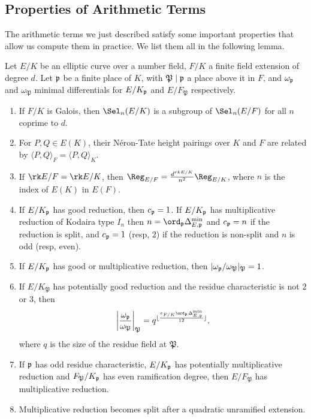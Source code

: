 \subsection{Properties of Arithmetic Terms}

The arithmetic terms we just described satisfy some important properties that allow us compute them in practice. We list them all in the following lemma.

\begin{lemma}
    Let $E/K$ be an elliptic curve over a number field, $F/K$ a finite field extension of degree $d$. Let $\mathfrak{p}$ be a finite place of $K$, with $\mathfrak{P}\mid\mathfrak{p}$ a place above it in $F$, and $\omega_{\mathfrak{p}}$ and $\omega_\mathfrak{P}$ minimal differentials for $E/K_{\mathfrak{p}}$ and $E/F_\mathfrak{P}$ respectively.
    \begin{enumerate}
        \item If $F/K$ is Galois, then $\Sel_n(E/K)$ is a subgroup of $\Sel_n(E/F)$ for all $n$ coprime to $d$.
        \item For $P,Q\in E(K)$, their Néron-Tate height pairings over $K$ and $F$ are related by $\langle P,Q\rangle_F=\langle P,Q\rangle_K$.
        \item If $\rk E/F=\rk E/K$, then $\Reg_{E/F}=\frac{d^{rk E/K}}{n^2}\Reg_{E/K}$, where $n$ is the index of $E(K)$ in $E(F)$.
        \item If $E/K_{\mathfrak{p}}$ has good reduction, then $c_{\mathfrak{p}}=1$. If $E/K_{\mathfrak{p}}$ has multiplicative reduction of Kodaira type $I_n$ then $n=\ord_\pp\Delta_{E,\pp}^{\min}$ and $c_{\mathfrak{p}}=n$ if the reduction is split, and $c_{\mathfrak{p}}=1$ (resp, $2$) if the reduction is non-split and $n$ is odd (resp, even).
        \item If $E/K_{\mathfrak{p}}$ has good or multiplicative reduction, then $|\omega_{\mathfrak{p}}/\omega_\mathfrak{P}|_\mathfrak{P}=1$.
        \item If $E/K_\mathfrak{P}$ has potentially good reduction and the residue characteristic is not $2$ or $3$, then 
        $$\left|\frac{\omega_\pp}{\omega_\mathfrak{P}}\right|_\mathfrak{P}=q^{\floor{\frac{e_{F/K}\ord_\pp\Delta_{E,\pp}^{\min}}{12}}},$$
        where $q$ is the size of the residue field at $\mathfrak{P}$.
        \item If $\mathfrak{p}$ has odd residue characteristic, $E/K_{\mathfrak{p}}$ has potentially multiplicative reduction and $F_\mathfrak{P}/K_{\mathfrak{p}}$ has even ramification degree, then $E/F_\mathfrak{P}$ has multiplicative reduction.
        \item Multiplicative reduction becomes split after a quadratic unramified extension.
    \end{enumerate}
\end{lemma}